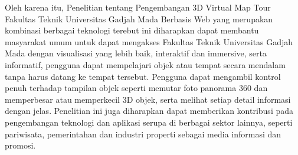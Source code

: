 Oleh karena itu, Penelitian tentang Pengembangan 3D Virtual Map Tour Fakultas Teknik Universitas 
Gadjah Mada Berbasis Web yang merupakan kombinasi berbagai teknologi terebut ini diharapkan dapat
membantu masyarakat umum untuk dapat mengakses Fakultas Teknik Universitas Gadjah Mada dengan visualisasi yang lebih baik, interaktif dan immersive, 
serta informatif, pengguna dapat mempelajari objek 
atau tempat secara mendalam tanpa harus datang ke tempat tersebut. Pengguna dapat mengambil 
kontrol penuh terhadap tampilan objek seperti memutar foto panorama 360 dan memperbesar atau 
memperkecil 3D objek, serta melihat setiap detail informasi dengan jelas.
Penelitian ini juga diharapkan dapat memberikan kontribusi pada pengembangan teknologi dan aplikasi
serupa di berbagai sektor lainnya, seperti pariwisata, pemerintahan dan industri properti sebagai
media informasi dan promosi.
				
		


